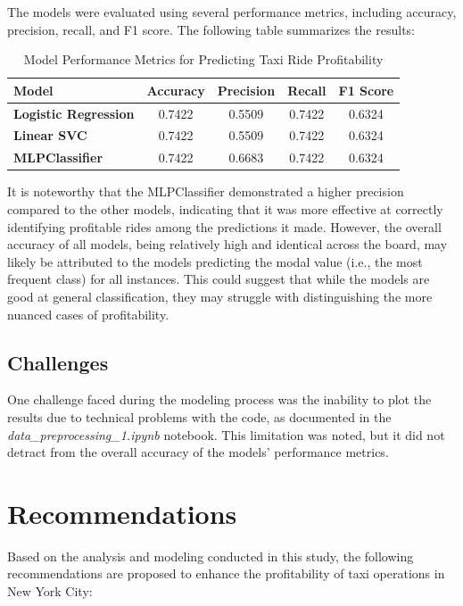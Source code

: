 \documentclass[11pt]{article}
\begin{document}
The models were evaluated using several performance metrics, including accuracy, precision, recall, and F1 score. The following table summarizes the results:

\begin{table}[h!]
\centering
\begin{tabular}{|l|c|c|c|c|}
\hline
\textbf{Model} & \textbf{Accuracy} & \textbf{Precision} & \textbf{Recall} & \textbf{F1 Score} \\ \hline
\textbf{Logistic Regression} & 0.7422 & 0.5509 & 0.7422 & 0.6324 \\ \hline
\textbf{Linear SVC} & 0.7422 & 0.5509 & 0.7422 & 0.6324 \\ \hline
\textbf{MLPClassifier} & 0.7422 & 0.6683 & 0.7422 & 0.6324 \\ \hline
\end{tabular}
\caption{Model Performance Metrics for Predicting Taxi Ride Profitability}
\label{tab:results}
\end{table}

It is noteworthy that the MLPClassifier demonstrated a higher precision compared to the other models, indicating that it was more effective at correctly identifying profitable rides among the predictions it made. However, the overall accuracy of all models, being relatively high and identical across the board, may likely be attributed to the models predicting the modal value (i.e., the most frequent class) for all instances. This could suggest that while the models are good at general classification, they may struggle with distinguishing the more nuanced cases of profitability.


\subsection{Challenges}

One challenge faced during the modeling process was the inability to plot the results due to technical problems with the code, as documented in the \textit{data\_preprocessing\_1.ipynb} notebook. This limitation was noted, but it did not detract from the overall accuracy of the models’ performance metrics.

\section{Recommendations}

Based on the analysis and modeling conducted in this study, the following recommendations are proposed to enhance the profitability of taxi operations in New York City:
\end{document}
